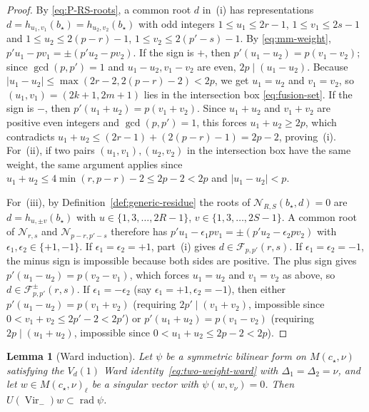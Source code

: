 \documentclass[twoside,10pt]{article}
\numberwithin{equation}{section}
\theoremstyle{slbody}
\newtheorem{lemma}[theorem]{Lemma}
\theoremstyle{definition}
\theoremstyle{remark}
\newcommand{\Vir}{\operatorname{Vir}}
\newcommand{\rad}{\operatorname{rad}}
\begin{document}
\begin{proof}
By \eqref{eq:P-RS-roots}, a common root \(d\) in~(i) has representations
\(d=h_{u_1,v_1}(b_\star)=h_{u_2,v_2}(b_\star)\) with odd integers
\(1\leq u_1\leq 2r-1\), \(1\leq v_1\leq 2s-1\) and
\(1\leq u_2\leq 2(p-r)-1\), \(1\leq v_2\leq 2(p'-s)-1\).  By
\eqref{eq:mm-weight}, \(p'u_1-pv_1=\pm(p'u_2-pv_2)\).
If the sign is \(+\), then \(p'(u_1-u_2)=p(v_1-v_2)\); since \(\gcd(p,p')=1\)
and \(u_1-u_2,v_1-v_2\) are even, \(2p\mid(u_1-u_2)\).  Because
\(|u_1-u_2|\leq\max(2r-2,2(p-r)-2)<2p\), we get \(u_1=u_2\) and \(v_1=v_2\),
so \((u_1,v_1)=(2k+1,2m+1)\) lies in the intersection box
\eqref{eq:fusion-set}.
If the sign is \(-\), then \(p'(u_1+u_2)=p(v_1+v_2)\).  Since \(u_1+u_2\) and
\(v_1+v_2\) are positive even integers and \(\gcd(p,p')=1\), this forces
\(u_1+u_2\geq 2p\), which contradicts
\(u_1+u_2\leq (2r-1)+(2(p-r)-1)=2p-2\), proving~(i).
For~(ii), if two pairs \((u_1,v_1),(u_2,v_2)\) in the intersection box have the
same weight, the same argument applies since
\(u_1+u_2\leq 4\min(r,p-r)-2\leq 2p-2<2p\) and \(|u_1-u_2|<p\).

For~(iii), by Definition~\ref{def:generic-residue} the roots of
\(\mathcal{N}_{R,S}(b_\star,d)=0\) are \(d=h_{u,\pm v}(b_\star)\) with
\(u\in\{1,3,\ldots,2R-1\}\), \(v\in\{1,3,\ldots,2S-1\}\).  A common root of
\(\mathcal{N}_{r,s}\) and \(\mathcal{N}_{p-r,p'-s}\) therefore has
\(p'u_1-\epsilon_1pv_1=\pm(p'u_2-\epsilon_2pv_2)\) with
\(\epsilon_1,\epsilon_2\in\{+1,-1\}\).  If \(\epsilon_1=\epsilon_2=+1\),
part~(i) gives \(d\in\mathcal{F}_{p,p'}(r,s)\).  If
\(\epsilon_1=\epsilon_2=-1\), the minus sign is impossible because both sides
are positive.  The plus sign gives \(p'(u_1-u_2)=p(v_2-v_1)\), which forces
\(u_1=u_2\) and \(v_1=v_2\) as above, so \(d\in\mathcal{F}^\pm_{p,p'}(r,s)\).
If \(\epsilon_1=-\epsilon_2\) (say \(\epsilon_1=+1,\epsilon_2=-1\)), then
either \(p'(u_1-u_2)=p(v_1+v_2)\) (requiring \(2p'\mid(v_1+v_2)\), impossible
since \(0<v_1+v_2\leq 2p'-2<2p'\)) or \(p'(u_1+u_2)=p(v_1-v_2)\) (requiring
\(2p\mid(u_1+u_2)\), impossible since \(0<u_1+u_2\leq 2p-2<2p\)).
\end{proof}

\begin{lemma}[Ward induction]\label{lem:ward-induction}
Let \(\psi\) be a symmetric bilinear form on \(M(c_\star,\nu)\) satisfying
the \(V_d(1)\) Ward identity~\eqref{eq:two-weight-ward} with
\(\Delta_1=\Delta_2=\nu\), and let \(w\in M(c_\star,\nu)_\ell\) be a singular
vector with \(\psi(w,v_\nu)=0\).  Then \(U(\Vir_-)w\subset\rad\psi\).
\end{lemma}
\end{document}
